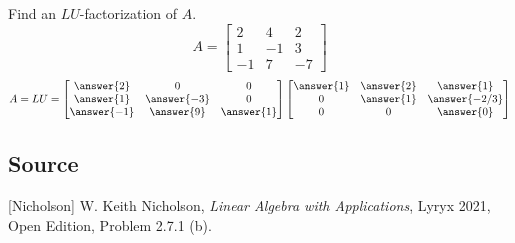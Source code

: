 \documentclass{ximera}
\author{}
\begin{document}
\begin{exercise}
Find an $LU$-factorization of $A$.
$$A=\begin{bmatrix}2 & 4 & 2\\1 & -1 & 3\\-1 & 7 & -7\end{bmatrix}$$ 
$$A=LU=\begin{bmatrix}\answer{2} & 0 & 0\\\answer{1} & \answer{-3} & 0\\\answer{-1} & \answer{9} & \answer{1}\end{bmatrix}\begin{bmatrix}\answer{1} & \answer{2} & \answer{1}\\0 & \answer{1} & \answer{-2/3}\\0 & 0 & \answer{0}\end{bmatrix}$$
 \end{exercise}
 
 \subsection*{Source}
[Nicholson] W. Keith Nicholson, {\it Linear Algebra with Applications}, Lyryx 2021, Open Edition, Problem 2.7.1 (b).
\end{document}
